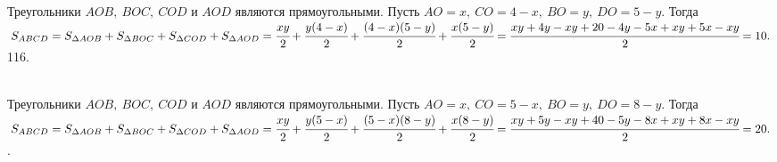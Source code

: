\documentclass[12pt]{article}
\begin{document}
Треугольники $AOB,\ BOC,\ COD$ и $AOD$ являются прямоугольными. Пусть $AO=x,\ CO=4-x,\ BO=y,\ DO=5-y.$ Тогда $S_{ABCD}=S_{\Delta AOB}+S_{\Delta BOC}+S_{\Delta COD}+S_{\Delta AOD}=\cfrac{xy}{2}+\cfrac{y(4-x)}{2}+\cfrac{(4-x)(5-y)}{2}+\cfrac{x(5-y)}{2}=\cfrac{xy+4y-xy+20-4y-5x+xy+5x-xy}{2}=10.$\\
116. \begin{figure}[ht!]
\end{figure}\\
Треугольники $AOB,\ BOC,\ COD$ и $AOD$ являются прямоугольными. Пусть $AO=x,\ CO=5-x,\ BO=y,\ DO=8-y.$ Тогда $S_{ABCD}=S_{\Delta AOB}+S_{\Delta BOC}+S_{\Delta COD}+S_{\Delta AOD}=\cfrac{xy}{2}+\cfrac{y(5-x)}{2}+\cfrac{(5-x)(8-y)}{2}+\cfrac{x(8-y)}{2}=\cfrac{xy+5y-xy+40-5y-8x+xy+8x-xy}{2}=20.$\newpage{}. \begin{figure}[ht!]
\end{figure}\\
\end{document}
